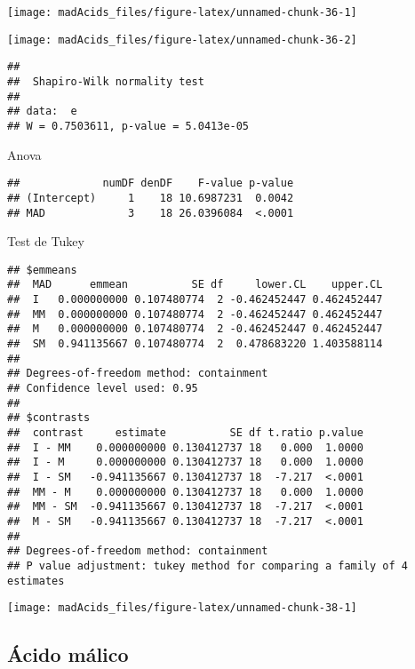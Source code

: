 \documentclass[
]{article}
\begin{document}
\begin{center}\texttt{[image: madAcids\_files/figure-latex/unnamed-chunk-36-1]} \end{center}

\begin{center}\texttt{[image: madAcids\_files/figure-latex/unnamed-chunk-36-2]} \end{center}

\begin{verbatim}
## 
##  Shapiro-Wilk normality test
## 
## data:  e
## W = 0.7503611, p-value = 5.0413e-05
\end{verbatim}

Anova

\begin{verbatim}
##             numDF denDF    F-value p-value
## (Intercept)     1    18 10.6987231  0.0042
## MAD             3    18 26.0396084  <.0001
\end{verbatim}

Test de Tukey

\begin{verbatim}
## $emmeans
##  MAD      emmean          SE df     lower.CL    upper.CL
##  I   0.000000000 0.107480774  2 -0.462452447 0.462452447
##  MM  0.000000000 0.107480774  2 -0.462452447 0.462452447
##  M   0.000000000 0.107480774  2 -0.462452447 0.462452447
##  SM  0.941135667 0.107480774  2  0.478683220 1.403588114
## 
## Degrees-of-freedom method: containment 
## Confidence level used: 0.95 
## 
## $contrasts
##  contrast     estimate          SE df t.ratio p.value
##  I - MM    0.000000000 0.130412737 18   0.000  1.0000
##  I - M     0.000000000 0.130412737 18   0.000  1.0000
##  I - SM   -0.941135667 0.130412737 18  -7.217  <.0001
##  MM - M    0.000000000 0.130412737 18   0.000  1.0000
##  MM - SM  -0.941135667 0.130412737 18  -7.217  <.0001
##  M - SM   -0.941135667 0.130412737 18  -7.217  <.0001
## 
## Degrees-of-freedom method: containment 
## P value adjustment: tukey method for comparing a family of 4 estimates
\end{verbatim}

\begin{center}\texttt{[image: madAcids\_files/figure-latex/unnamed-chunk-38-1]} \end{center}

\subsection{Ácido málico}\label{uxe1cido-muxe1lico-1}
\end{document}
